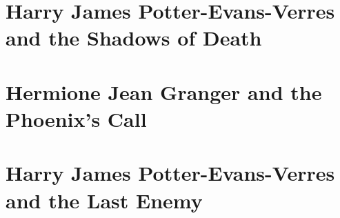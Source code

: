 \part{Harry James Potter-Evans-Verres and the Shadows of Death}


























\part{Hermione Jean Granger and the Phoenix's Call}
\setcounter{chapter}{64}





















\part{Harry James Potter-Evans-Verres and the Last Enemy}














